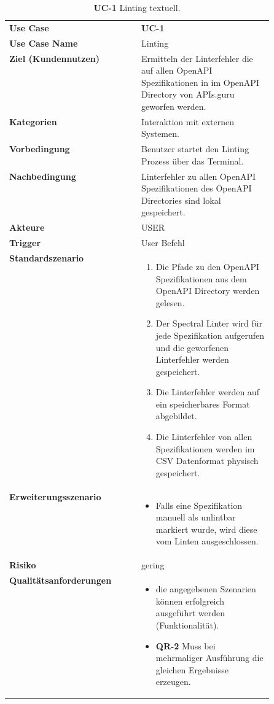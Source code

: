\begin{longtable}{lp{0.5\linewidth}}
  \caption{\textbf{UC-1} Linting textuell.}
  \endfirsthead
  \endhead
  \hline\hline
  \textbf{Use Case} & \textbf{UC-1} \\
  \textbf{Use Case Name} & Linting \\
  \textbf{Ziel (Kundennutzen)} & Ermitteln der Linterfehler die auf allen OpenAPI Spezifikationen in im OpenAPI Directory von APIs.guru geworfen werden. \\
  \textbf{Kategorien} & Interaktion mit externen Systemen.  \\
  \textbf{Vorbedingung} & Benutzer startet den Linting Prozess über das Terminal. \\
  \textbf{Nachbedingung} & Linterfehler zu allen OpenAPI Spezifikationen des OpenAPI Directories sind lokal gespeichert. \\
  \textbf{Akteure} & USER \\
  \textbf{Trigger} & User Befehl \\
  \textbf{Standardszenario} & 
  \vspace{-0.7cm}
  \begin{enumerate}
    \item Die Pfade zu den OpenAPI Spezifikationen aus dem OpenAPI Directory werden gelesen.
    \item Der Spectral Linter wird für jede Spezifikation aufgerufen und die geworfenen Linterfehler werden gespeichert.
    \item Die Linterfehler werden auf ein speicherbares Format abgebildet.
    \item Die Linterfehler von allen Spezifikationen werden im \acf{CSV} Datenformat physisch gespeichert.
  \end{enumerate}
  \\
  \textbf{Erweiterungsszenario} & 
  \vspace{-0.7cm}
  \begin{itemize}
    \item Falls eine Spezifikation manuell als unlintbar markiert wurde, wird diese vom Linten ausgeschlossen.
  \end{itemize}
  \\
  \textbf{Risiko} & \hspace{0.8cm} gering \\
  \textbf{Qualitätsanforderungen} & 
  \vspace{-0.7cm}
  \begin{itemize}
    \item die angegebenen Szenarien können erfolgreich ausgeführt werden (Funktionalität).
    \item \textbf{QR-2} Muss bei mehrmaliger Ausführung die gleichen Ergebnisse erzeugen.
  \end{itemize}
   \\ \hline\hline
\end{longtable}

